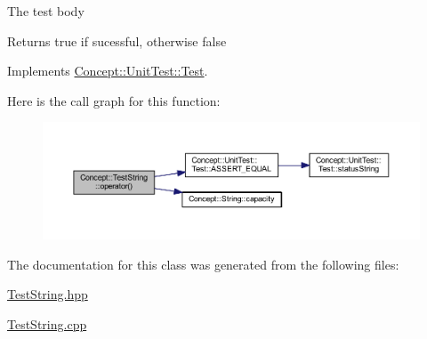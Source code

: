 The test body \begin{DoxyReturn}{Returns}
true if sucessful, otherwise false 
\end{DoxyReturn}


Implements \mbox{\hyperlink{class_concept_1_1_unit_test_1_1_test_aa8c081714f642696eeef640911be752a}{Concept\+::\+Unit\+Test\+::\+Test}}.

Here is the call graph for this function\+:\nopagebreak
\begin{figure}[H]
\begin{center}
\leavevmode
\includegraphics[width=350pt]{class_concept_1_1_test_string_a4d493ef2d0632c5015042821be5682ff_cgraph}
\end{center}
\end{figure}


The documentation for this class was generated from the following files\+:\begin{DoxyCompactItemize}
\item 
\mbox{\hyperlink{_test_string_8hpp}{Test\+String.\+hpp}}\item 
\mbox{\hyperlink{_test_string_8cpp}{Test\+String.\+cpp}}\end{DoxyCompactItemize}
